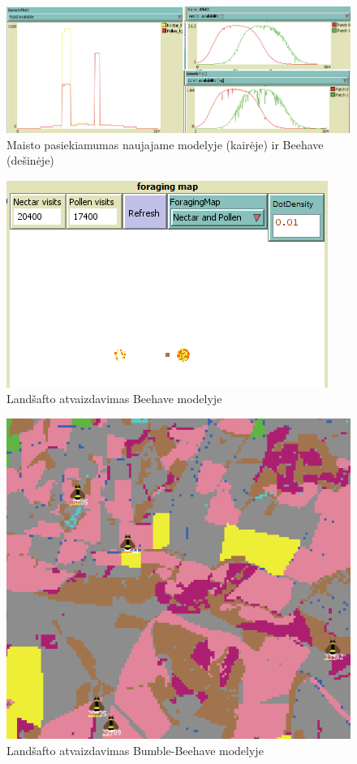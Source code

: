 \documentclass{VUMIFPSmagistrinis}
\begin{document}
\begin{figure}[H]
    \centering
    \includegraphics[scale=0.5]{img/mtd3/mtdp3v11-img004.png}
    \caption{Maisto pasiekiamumas naujajame modelyje (kairėje) ir Beehave (dešinėje)}
    \label{img:m4}
\end{figure}

\begin{figure}[H]
    \centering
    \includegraphics[scale=0.75]{img/mtd3/mtdp3v11-img005.png}
    \caption{Landšafto atvaizdavimas Beehave modelyje}
    \label{img:m5}
\end{figure}

\begin{figure}[H]
    \centering
    \includegraphics[scale=0.75]{img/mtd3/mtdp3v11-img006.png}
    \caption{Landšafto atvaizdavimas Bumble-Beehave modelyje}
    \label{img:m6}
\end{figure}
\end{document}
